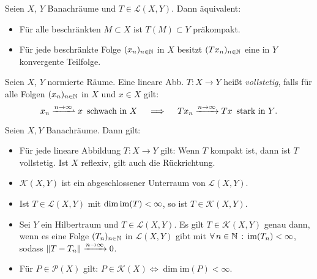 \documentclass{cheat-sheet}
\newcommand{\LSO}{\mathcal{L}} %
\newcommand{\convWith}[1]{\xrightarrow{#1 \to \infty}} %
\newcommand{\convWeaklyWith}[1]{\xrightharpoonup{#1 \to \infty}} %
\begin{document}
\begin{defn}
  Seien $X$, $Y$ Banachräume und $T \in \LSO(X, Y)$. Dann äquivalent:
  \begin{itemize}
    \item Für alle beschränkten $M \subset X$ ist $T(M) \subset Y$ präkompakt.
    \item Für jede beschränkte Folge $(x_n)_{n \in \mathbb{N}}$ in $X$ besitzt $(T x_n)_{n \in \mathbb{N}}$ eine in $Y$ konvergente Teilfolge.
  \end{itemize}
\end{defn}


\begin{defn}
  Seien $X$, $Y$ normierte Räume. Eine lineare Abb. $T : X \to Y$ heißt \emph{vollstetig}, falls für alle Folgen $(x_n)_{n \in \mathbb{N}}$ in $X$ und $x \in X$ gilt:
  \[
    x_n \convWeaklyWith{n} x \enspace \text{schwach in $X$}
    \quad \implies \quad
    T x_n \convWith{n} T x \enspace \text{stark in $Y$.}
  \]
\end{defn}

\begin{lem}
  Seien $X, Y$ Banachräume. Dann gilt:
  \begin{itemize}
    \item Für jede lineare Abbildung $T : X \to Y$ gilt: Wenn $T$ kompakt ist, dann ist $T$ vollstetig. Ist $X$ reflexiv, gilt auch die Rückrichtung. %
    \item $\mathcal{K}(X, Y)$ ist ein abgeschlossener Unterraum von $\LSO(X, Y)$.
    \item Ist $T \in \LSO(X, Y)$ mit $\dim \mathop{\mathrm{im}}(T) < \infty$, so ist $T \in \mathcal{K}(X, Y)$.
    \item Sei $Y$ ein Hilbertraum und $T \in \LSO(X, Y)$. Es gilt $T \in \mathcal{K}(X, Y)$ genau dann, wenn es eine Folge $(T_n)_{n \in \mathbb{N}}$ in $\LSO(X, Y)$ gibt mit $\forall \, {n \in \mathbb{N}} \,:\, \mathop{\mathrm{im}}(T_n) < \infty$, sodass $\norm{T-T_n} \convWith{n} 0$.
    \item Für $P \in \mathcal{P}(X)$ gilt: $P \in \mathcal{K}(X) \iff \dim \mathrm{im}(P) < \infty$.
  \end{itemize}
\end{lem}

\end{document}
